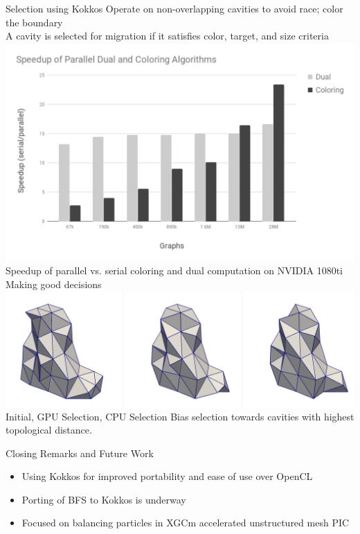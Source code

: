 \documentclass[final]{beamer}
\newlength{\onecolwid}
\begin{document}
\begin{frame}[t]
\begin{columns}[t]
\begin{column}{\onecolwid}
\begin{block}{Selection using Kokkos}
  Operate on non-overlapping cavities to avoid race; color the boundary \\
  A cavity is selected for migration if it satisfies color, target, and size
  criteria \\
  { \centering
    \includegraphics[width=\textwidth]{../accelerated_cse19/figures/kkColoringAndDual.png}\\
    Speedup of parallel vs. serial coloring and dual computation on NVIDIA 1080ti
  }
  Making good decisions
  { \centering
    \includegraphics[width=\textwidth]{../accelerated_cse19/figures/selectionEx.png}\\
    Initial, GPU Selection, CPU Selection
  }
  Bias selection towards cavities with highest topological distance.
\end{block}

\begin{block}{Closing Remarks and Future Work}
  \begin{itemize}
    \item Using Kokkos for improved portability and ease of use over OpenCL
    \item Porting of BFS to Kokkos is underway
    \item Focused on balancing particles in XGCm accelerated unstructured mesh PIC
  \end{itemize}
\end{block}


\end{column}
\end{columns}
\end{frame}
\end{document}
